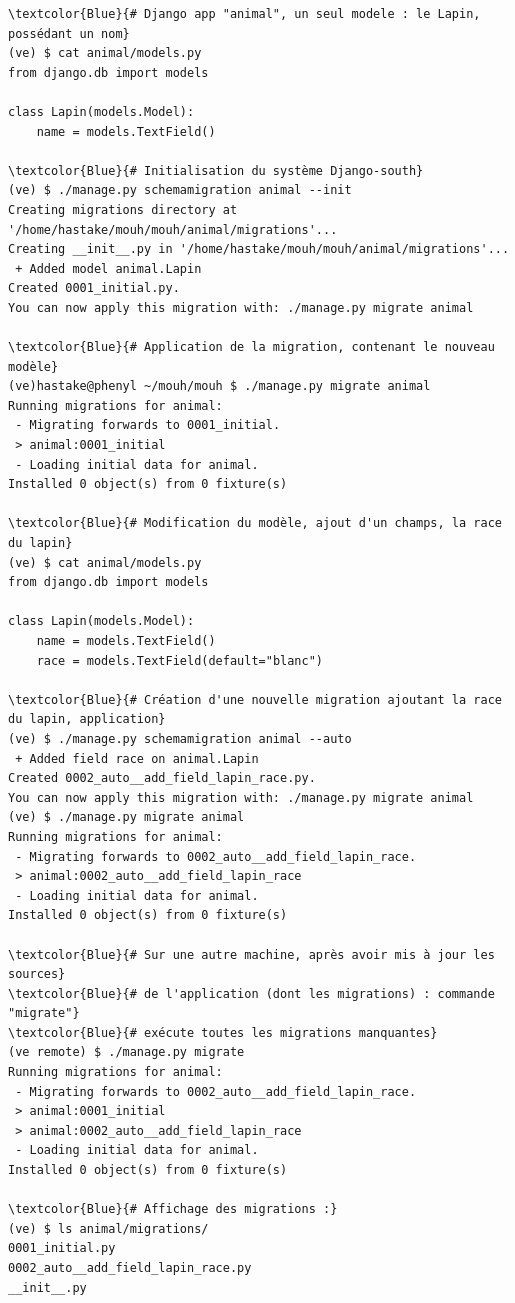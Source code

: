 \documentclass[a4paper,12pt]{article}
\begin{document}
\begin{Verbatim}
\textcolor{Blue}{# Django app "animal", un seul modele : le Lapin, possédant un nom}
(ve) $ cat animal/models.py
from django.db import models

class Lapin(models.Model):
    name = models.TextField()

\textcolor{Blue}{# Initialisation du système Django-south}
(ve) $ ./manage.py schemamigration animal --init
Creating migrations directory at '/home/hastake/mouh/mouh/animal/migrations'...
Creating __init__.py in '/home/hastake/mouh/mouh/animal/migrations'...
 + Added model animal.Lapin
Created 0001_initial.py.
You can now apply this migration with: ./manage.py migrate animal

\textcolor{Blue}{# Application de la migration, contenant le nouveau modèle}
(ve)hastake@phenyl ~/mouh/mouh $ ./manage.py migrate animal
Running migrations for animal:
 - Migrating forwards to 0001_initial.
 > animal:0001_initial
 - Loading initial data for animal.
Installed 0 object(s) from 0 fixture(s)

\textcolor{Blue}{# Modification du modèle, ajout d'un champs, la race du lapin}
(ve) $ cat animal/models.py
from django.db import models

class Lapin(models.Model):
    name = models.TextField()
    race = models.TextField(default="blanc")

\textcolor{Blue}{# Création d'une nouvelle migration ajoutant la race du lapin, application}
(ve) $ ./manage.py schemamigration animal --auto
 + Added field race on animal.Lapin
Created 0002_auto__add_field_lapin_race.py.
You can now apply this migration with: ./manage.py migrate animal
(ve) $ ./manage.py migrate animal
Running migrations for animal:
 - Migrating forwards to 0002_auto__add_field_lapin_race.
 > animal:0002_auto__add_field_lapin_race
 - Loading initial data for animal.
Installed 0 object(s) from 0 fixture(s)

\textcolor{Blue}{# Sur une autre machine, après avoir mis à jour les sources}
\textcolor{Blue}{# de l'application (dont les migrations) : commande "migrate"}
\textcolor{Blue}{# exécute toutes les migrations manquantes}
(ve remote) $ ./manage.py migrate
Running migrations for animal:
 - Migrating forwards to 0002_auto__add_field_lapin_race.
 > animal:0001_initial
 > animal:0002_auto__add_field_lapin_race
 - Loading initial data for animal.
Installed 0 object(s) from 0 fixture(s)

\textcolor{Blue}{# Affichage des migrations :}
(ve) $ ls animal/migrations/
0001_initial.py
0002_auto__add_field_lapin_race.py
__init__.py
\end{Verbatim}
\end{document}
